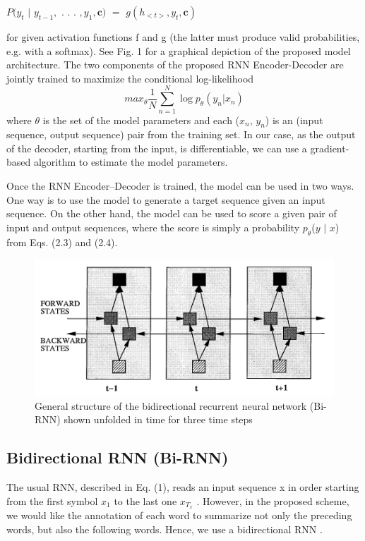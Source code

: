 \documentclass[12pt]{report}
\begin{document}
\begin{center} $P( y_{t}$ $|$ $y_{t−1},\text{ . . . }, y_{1}, \textbf{c})$ $=$ $g \left( h_{<t>}, y_{t}, \textbf{c} \right)$
\end{center}
for given activation functions f and g (the latter
must produce valid probabilities, e.g. with a softmax).
See Fig. 1 for a graphical depiction of the proposed
model architecture.
The two components of the proposed RNN
Encoder-Decoder are jointly trained to maximize
the conditional log-likelihood
\begin{equation}
max_{\theta} \frac{1}{N} \sum_{n=1}^{N} \log  p_{\theta} \left( y_{n} | x_{n} \right)
\end{equation}
where $\theta$ is the set of the model parameters and
each ($x_{n}$, $y_{n}$) is an (input sequence, output sequence)
pair from the training set. In our case,
as the output of the decoder, starting from the input,
is differentiable, we can use a gradient-based
algorithm to estimate the model parameters.

Once the RNN Encoder–Decoder is trained, the
model can be used in two ways. One way is to use
the model to generate a target sequence given an
input sequence. On the other hand, the model can
be used to score a given pair of input and output
sequences, where the score is simply a probability
$p_{\theta}$($y$ $|$ $x$) from Eqs. (2.3) and (2.4).

\begin{figure}
\centering
\includegraphics[width=5in]{birnn_fig.png}
\caption{General structure of the bidirectional recurrent neural network (Bi-RNN) shown unfolded in time for three time steps}
\label{birnn_fig}
\end{figure}

\subsection{Bidirectional RNN (Bi-RNN)}
The usual RNN, described in Eq. (1), reads an input sequence x in order starting from the first
symbol $x_{1}$ to the last one $x_{T_{x}}$
. However, in the proposed scheme, we would like the annotation
of each word to summarize not only the preceding words, but also the following words. Hence, we use a bidirectional RNN \cite{birnn}.
\end{document}
